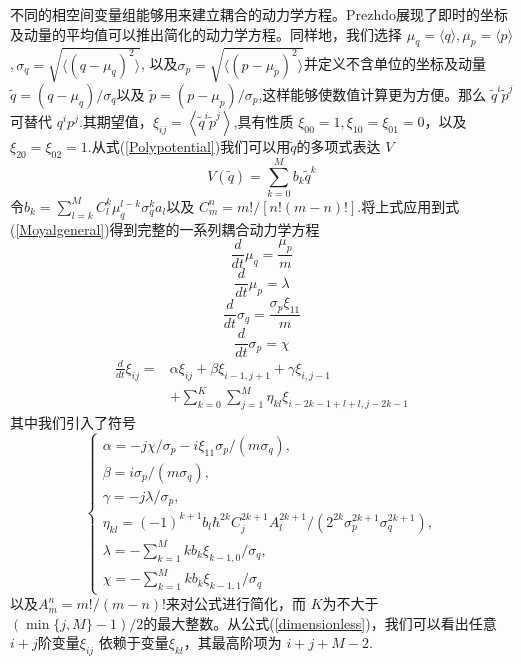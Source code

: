 不同的相空间变量组能够用来建立耦合的动力学方程。Prezhdo展现了即时的坐标及动量的平均值可以推出简化的动力学方程。同样地，我们选择 $\mu_q=\langle q \rangle $,\,$\mu_p = \langle p \rangle $,\,$\sigma_q = \sqrt{\langle (q-\mu_q)^2 \rangle }$, 以及$\sigma_p = \sqrt{\langle (p-\mu_p)^2 \rangle }$并定义不含单位的坐标及动量 $\tilde{q}=\left(q-\mu_{q}\right) / \sigma_{q}$以及 $\tilde{p}=\left(p-\mu_{p}\right) / \sigma_{p}$,这样能够使数值计算更为方便。那么 $\tilde{q}^{i} \tilde{p}^{j}$可替代 $q^{i} p^{j}$.其期望值，$\xi_{i j}=\left\langle\tilde{q}^{i} \tilde{p}^{j}\right\rangle$,具有性质 $\xi_{00}=1, \xi_{10}=\xi_{01}=0$，以及 $\xi_{20}=\xi_{02}=1$.从式(\ref{Polypotential})我们可以用$\tilde{q}$的多项式表达 $V$ 
\begin{equation}
	V(\tilde{q})=\sum_{k=0}^{M} b_{k} \tilde{q}^{k}
\end{equation}
令$b_{k}=\sum_{l=k}^{M} C_{l}^{k} \mu_{q}^{l-k} \sigma_{q}^{k} a_{l}$以及 $C_{m}^{n}=m ! /[n !(m-n) !]$.将上式应用到式(\ref{Moyalgeneral})得到完整的一系列耦合动力学方程
\begin{equation}
	\frac{d}{d t} \mu_{q}=\frac{\mu_{p}}{m}
	\label{muq}
\end{equation}
\begin{equation}
	\frac{d}{d t} \mu_{p}= \lambda
	\label{mup}
\end{equation}
\begin{equation}
	\frac{d}{d t} \sigma_{q}=\frac{\sigma_{p} \xi_{11}}{m}
\end{equation}
\begin{equation}
	\frac{d}{d t} \sigma_{p}=\chi
\end{equation}
\begin{equation}
	\begin{aligned} \frac{d}{d t} \xi_{i j}=& \alpha \xi_{i j}+\beta \xi_{i-1, j+1}+\gamma \xi_{i, j-1} \\ &+\sum_{k=0}^{K} \sum_{j=1}^{M} \eta_{k l} \xi_{i-2 k-1+l+l, j-2 k-1} \end{aligned}
	\label{dimensionless}
\end{equation}
其中我们引入了符号
\begin{equation*}
	\begin{cases}
	\alpha=-j \chi / \sigma_{p}-i \xi_{11} \sigma_{p} / (m\sigma_q),\\
	\beta=i \sigma_{p} /\left(m \sigma_{q}\right),\\
	 \gamma=-j \lambda / \sigma_{p}, \\
	 \eta_{k l}=(-1)^{k+1} b_{l}\hbar^{2 k} C_{j}^{2 k+1} A_{l}^{2 k+1} /\left(2^{2 k} \sigma_{p}^{2 k+1} \sigma_{q}^{2 k+1}\right),\\
	 \lambda=-\sum_{k=1}^{M} k b_{k} \xi_{k-1,0} / \sigma_{q}, \\
	 \chi=-\sum_{k=1}^{M} k b_{k} \xi_{k-1,1} / \sigma_{q} 
	\end{cases}
\end{equation*}
以及$A_{m}^{n}=m ! /(m-n) !$来对公式进行简化，而 $K$为不大于 $(\min \{j, M\}-1) / 2$的最大整数。从公式(\ref{dimensionless})，我们可以看出任意$i+j$阶变量$\xi_{ij}$ 依赖于变量$\xi_{kl}$，其最高阶项为 $i+j+M-2$.

